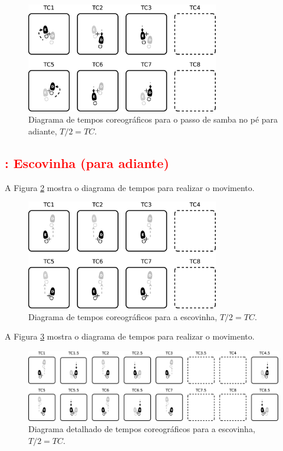 \begin{figure}[h]
  \centering
    \includegraphics[width=0.75\textwidth]{chapters/cap-passos-footwork/samba-no-pe-adiante-b.eps}
\caption{Diagrama de tempos coreográficos para o passo de samba no pé para adiante, $T/2=TC$.}
\label{fig:pessoa-samba-no-pe-adiante-b}
\end{figure}


\subsection{\textcolor{red}{\Variante: Escovinha (para adiante)}}

A Figura \ref{fig:pessoalescovinha} mostra o diagrama de tempos para realizar o movimento.

\begin{figure}[h]
  \centering
    \includegraphics[width=0.75\textwidth]{chapters/cap-passos-footwork/escovinha.eps}
\caption{Diagrama de tempos coreográficos para a escovinha, $T/2=TC$.}
\label{fig:pessoalescovinha}
\end{figure}

A Figura \ref{fig:pessoalescovinha2} mostra o diagrama de tempos para realizar o movimento.
\begin{figure}[h]
  \centering
    \includegraphics[width=\textwidth]{chapters/cap-passos-footwork/escovinha2.eps}
\caption{Diagrama detalhado de tempos coreográficos para a escovinha, $T/2=TC$.}
\label{fig:pessoalescovinha2}
\end{figure}

